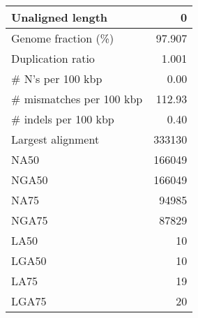 \documentclass[12pt,a4paper]{article}
\begin{document}
\begin{table}[ht]
\begin{center}
\begin{tabular}{|l*{1}{|r}|}
Unaligned length & 0 \\ \hline
Genome fraction (\%) & 97.907 \\ \hline
Duplication ratio & 1.001 \\ \hline
\# N's per 100 kbp & 0.00 \\ \hline
\# mismatches per 100 kbp & 112.93 \\ \hline
\# indels per 100 kbp & 0.40 \\ \hline
Largest alignment & 333130 \\ \hline
NA50 & 166049 \\ \hline
NGA50 & 166049 \\ \hline
NA75 & 94985 \\ \hline
NGA75 & 87829 \\ \hline
LA50 & 10 \\ \hline
LGA50 & 10 \\ \hline
LA75 & 19 \\ \hline
LGA75 & 20 \\ \hline
\end{tabular}
\end{center}
\end{table}
\end{document}
